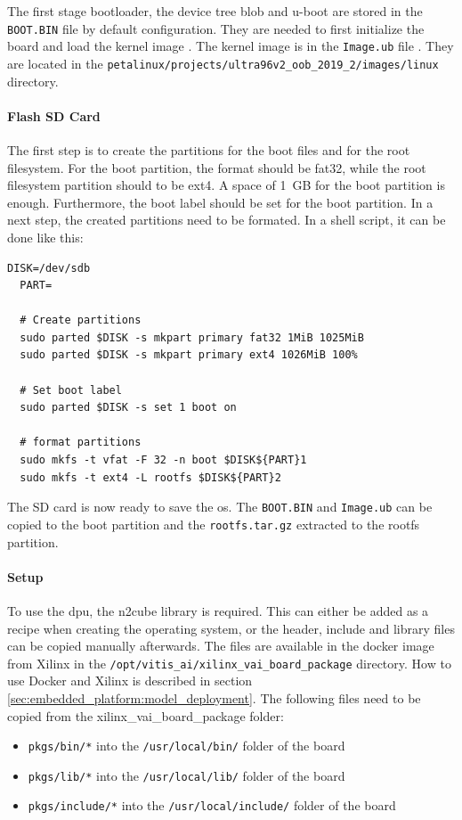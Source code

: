 The first stage bootloader, the device tree blob and u-boot are stored in the \texttt{BOOT.BIN} file by default configuration.
They are needed to first initialize the board and load the kernel image \cite{xilinx_wiki_boot}.
The kernel image is in the \texttt{Image.ub} file \cite{xilinx_wiki_uboot}.
They are located in the \texttt{petalinux/projects/ultra96v2\_oob\_2019\_2/images/linux} directory.

\paragraph{Flash SD Card}
The first step is to create the partitions for the boot files and for the root filesystem.
For the boot partition, the format should be fat32, while the root filesystem partition should to be ext4.
A space of \SI{1}{GB} for the boot partition is enough.
Furthermore, the boot label should be set for the boot partition.
In a next step, the created partitions need to be formated.
In a shell script, it can be done like this:

\begin{lstlisting}[style=bash, caption={Prepare SD card}, label=lst:create_partitions]
  DISK=/dev/sdb
  PART=

  # Create partitions
  sudo parted $DISK -s mkpart primary fat32 1MiB 1025MiB
  sudo parted $DISK -s mkpart primary ext4 1026MiB 100%

  # Set boot label
  sudo parted $DISK -s set 1 boot on

  # format partitions
  sudo mkfs -t vfat -F 32 -n boot $DISK${PART}1
  sudo mkfs -t ext4 -L rootfs $DISK${PART}2
\end{lstlisting}

The SD card is now ready to save the \acrshort{os}.
The \texttt{BOOT.BIN} and \texttt{Image.ub} can be copied to the boot partition and the \texttt{rootfs.tar.gz} extracted to the rootfs partition.

\paragraph{Setup}
To use the \acrshort{dpu}, the \acrshort{n2cube} library is required.
This can either be added as a recipe when creating the operating system, or the header, include and library files can be copied manually afterwards.
The files are available in the docker image from Xilinx in the \texttt{/opt/vitis\_ai/xilinx\_vai\_board\_package} directory.
How to use Docker and Xilinx is described in section \ref{sec:embedded_platform:model_deployment}.
The following files need to be copied from the xilinx\_vai\_board\_package folder:
\begin{itemize}
	\item \texttt{pkgs/bin/*} into the \texttt{/usr/local/bin/} folder of the board
	\item \texttt{pkgs/lib/*} into the \texttt{/usr/local/lib/} folder of the board
	\item \texttt{pkgs/include/*} into the \texttt{/usr/local/include/} folder of the board
\end{itemize}

